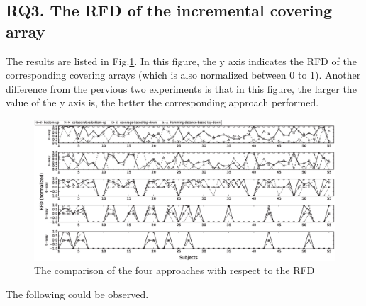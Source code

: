 \documentclass[conference]{IEEEtran}
\theoremstyle{definition}
\begin{document}

\subsection{RQ3. The RFD of the incremental covering array}

The results are listed in Fig.\ref{experiement_rfd}. In this figure, the y axis indicates the RFD of the corresponding covering arrays (which is also normalized between 0 to 1). Another difference from the pervious two experiments is that in this figure, the larger the value of the y axis is, the better the corresponding approach performed.

\begin{figure}[htbp]
\center
 \includegraphics[width=7.4in]{rfd-degree.eps}
\caption{The comparison of the four approaches with respect to the RFD}
\label{experiement_rfd}
\end{figure}

The following could be observed.
\end{document}
